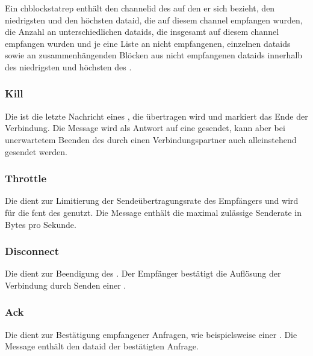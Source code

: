 Ein \gls{chblockstatrep} enthält den \gls{channelid} des
 auf den er sich bezieht,
den niedrigsten und den höchsten \gls{dataid}, die auf diesem \gls{channel}
empfangen wurden, %
die Anzahl an unterschiedlichen \glspl{dataid}, die insgesamt auf diesem
\gls{channel} empfangen wurden
und je eine Liste an nicht empfangenen, einzelnen \glspl{dataid} sowie an
zusammenhängenden Blöcken aus nicht empfangenen \glspl{dataid} innerhalb des
niedrigsten und höchsten  des
.

\bmcpchblockstatrepbytefield


\subsubsection*{Kill}
\label{dcl-bmcp-kill}
Die \msg{\bmcpkill} ist die letzte Nachricht eines , die
übertragen wird und markiert das Ende der Verbindung.
Die Message wird als Antwort auf eine \msg{\bmcpdisconnect} gesendet, kann aber
bei unerwartetem Beenden des  durch einen
Verbindungspartner auch alleinstehend gesendet werden.

\bmcpkillbytefield


\subsubsection*{Throttle}
\label{dcl-bmcp-throttle}
Die \msg{\bmcpthrottle} dient zur Limitierung der Sendeübertragungsrate des
Empfängers und wird für die \gls{fcnt} des  genutzt.
Die Message enthält die maximal zulässige Senderate in Bytes pro Sekunde.

\bmcpthrottlebytefield


\subsubsection*{Disconnect}
\label{dcl-bmcp-disconnect}
Die \msg{\bmcpdisconnect} dient zur Beendigung des .
Der Empfänger bestätigt die Auflösung der Verbindung durch Senden einer
\msg{\bmcpkill}.

\bmcpdisconnectbytefield


\subsubsection*{Ack}
\label{dcl-bmcp-ack}
Die \msg{\bmcpack} dient zur Bestätigung empfangener Anfragen, wie
beispielsweise einer \msg{\bmcpopenchreq}.
Die Message enthält den \gls{dataid} der bestätigten Anfrage.

